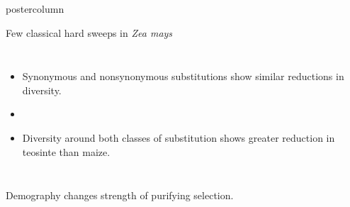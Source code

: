\documentclass[final]{beamer}
\newlength{\columnheight}
\begin{document}
\begin{frame}
\begin{columns}
    \begin{column}{.49\textwidth}
      \begin{beamercolorbox}[center,wd=\textwidth]{postercolumn}
        \begin{minipage}[T]{.95\textwidth} %
          \parbox[t][\columnheight]{\textwidth}{ %
            \begin{block}{Few classical hard sweeps in \emph{Zea mays}}
              \begin{columns}
              \begin{itemize}
                \item Synonymous and nonsynonymous substitutions show similar reductions in diversity. %
                \item[]
                \item Diversity around both classes of substitution shows greater reduction in teosinte than maize.
              \end{itemize}
              \centering
              \end{columns}
            \end{block}
            \vfill
            \begin{block}{Demography changes strength of purifying selection.}

\end{block}}
\end{minipage}
\end{beamercolorbox}
\end{column}
\end{columns}
\end{frame}
\end{document}
